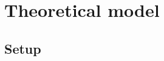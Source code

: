 \documentclass[12pt]{article}
\begin{document}





\section{Theoretical model}\label{sec:model}
	
	\subsection{Setup}
	
\end{document}
